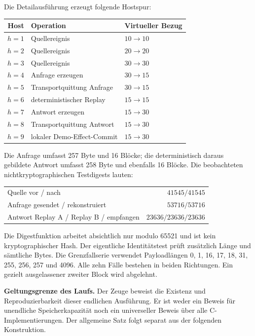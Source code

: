 \documentclass[11pt,a4paper]{article}
\theoremstyle{remark}
\newcommand{\statusbox}[2]{%
  \par\medskip\noindent
  \colorbox{#1}{\parbox{\dimexpr\linewidth-2\fboxsep\relax}{#2}}%
  \par\medskip
}
\begin{document}
Die Detailausführung erzeugt folgende Hostspur:

\begin{longtable}{@{}rll@{}}
\toprule
\textbf{Host} & \textbf{Operation} & \textbf{Virtueller Bezug} \\
\midrule
\endhead
\(h=1\) & Quellereignis & \(10\rightarrow10\)\\
\(h=2\) & Quellereignis & \(20\rightarrow20\)\\
\(h=3\) & Quellereignis & \(30\rightarrow30\)\\
\(h=4\) & Anfrage erzeugen & \(30\rightarrow15\)\\
\(h=5\) & Transportquittung Anfrage & \(30\rightarrow15\)\\
\(h=6\) & deterministischer Replay & \(15\rightarrow15\)\\
\(h=7\) & Antwort erzeugen & \(15\rightarrow30\)\\
\(h=8\) & Transportquittung Antwort & \(15\rightarrow30\)\\
\(h=9\) & lokaler Demo-Effect-Commit & \(15\rightarrow30\)\\
\bottomrule
\end{longtable}

Die Anfrage umfasst 257 Byte und 16 Blöcke; die deterministisch daraus
gebildete Antwort umfasst 258 Byte und ebenfalls 16 Blöcke. Die beobachteten
nichtkryptographischen Testdigests lauten:

\begin{center}
\begin{tabular}{@{}lr@{}}
\toprule
Quelle vor / nach & \(41545/41545\)\\
Anfrage gesendet / rekonstruiert & \(53716/53716\)\\
Antwort Replay A / Replay B / empfangen & \(23636/23636/23636\)\\
\bottomrule
\end{tabular}
\end{center}

Die Digestfunktion arbeitet absichtlich nur modulo 65521 und ist kein
kryptographischer Hash. Der eigentliche Identitätstest prüft zusätzlich
Länge und sämtliche Bytes. Die Grenzfallserie verwendet Payloadlängen
0, 1, 16, 17, 18, 31, 255, 256, 257 und 4096. Alle zehn Fälle bestehen in
beiden Richtungen. Ein gezielt ausgelassener zweiter Block wird abgelehnt.

\statusbox{QAmber}{
\textbf{Geltungsgrenze des Laufs.}
Der Zeuge beweist die Existenz und Reproduzierbarkeit dieser endlichen
Ausführung. Er ist weder ein Beweis für unendliche Speicherkapazität noch ein
universeller Beweis über alle C-Implementierungen. Der allgemeine Satz folgt
separat aus der folgenden Konstruktion.
}
\end{document}
